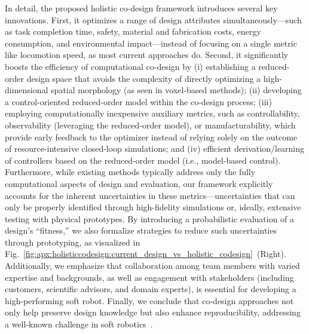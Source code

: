 In detail, the proposed holistic co-design framework introduces several key innovations. First, it optimizes a range of design attributes simultaneously—such as task completion time, safety, material and fabrication costs, energy consumption, and environmental impact—instead of focusing on a single metric like locomotion speed, as most current approaches do. Second, it significantly boosts the efficiency of computational co-design by (i) establishing a reduced-order design space that avoids the complexity of directly optimizing a high-dimensional spatial morphology (as seen in voxel-based methods); (ii) developing a control-oriented reduced-order model within the co-design process; (iii) employing computationally inexpensive auxiliary metrics, such as controllability, observability (leveraging the reduced-order model), or manufacturability, which provide early feedback to the optimizer instead of relying solely on the outcome of resource-intensive closed-loop simulations; and (iv) efficient derivation/learning of controllers based on the reduced-order model (i.e., model-based control).
Furthermore, while existing methods typically address only the fully computational aspects of design and evaluation, our framework explicitly accounts for the inherent uncertainties in these metrics—uncertainties that can only be properly identified through high-fidelity simulations or, ideally, extensive testing with physical prototypes. By introducing a probabilistic evaluation of a design’s “fitness,” we also formalize strategies to reduce such uncertainties through prototyping, as visualized in Fig.~\ref{fig:apx:holisticcodesign:current_design_vs_holistic_codesign}~(Right). Additionally, we emphasize that collaboration among team members with varied expertise and backgrounds, as well as engagement with stakeholders (including customers, scientific advisors, and domain experts), is essential for developing a high-performing soft robot. Finally, we conclude that co-design approaches not only help preserve design knowledge but also enhance reproducibility, addressing a well-known challenge in soft robotics~\citep{baines2024need}.

